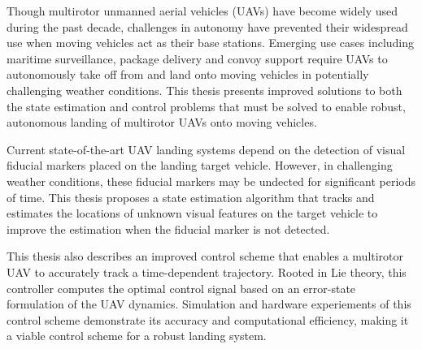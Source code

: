 \afterpage{\cleardoublepage}
Though multirotor unmanned aerial vehicles (UAVs) have become widely used 
during the past decade, challenges in autonomy have prevented their
widespread use when moving vehicles act as their base stations.
Emerging use cases including maritime
surveillance, package delivery and convoy support require UAVs to autonomously
take off from and land onto moving vehicles in potentially challenging weather
conditions. This thesis presents improved solutions to both the state estimation and
control problems that must be solved
to enable robust, autonomous landing of multirotor UAVs onto moving vehicles.

Current state-of-the-art UAV landing systems depend on the detection of visual
fiducial markers placed on the landing target vehicle. However, in challenging
weather conditions, these fiducial markers may be undected for significant
periods of time. This thesis proposes a state estimation algorithm that tracks
and estimates the locations of unknown visual features on the target vehicle to
improve the estimation
when the fiducial marker is not detected.

This thesis also describes an improved control scheme that enables a multirotor
UAV to accurately track a time-dependent trajectory. Rooted in Lie theory, this
controller computes the optimal control signal based on an error-state
formulation of the UAV dynamics.
Simulation and hardware experiements of this control scheme demonstrate its
accuracy and computational efficiency, making it a viable control scheme for a
robust landing system.
